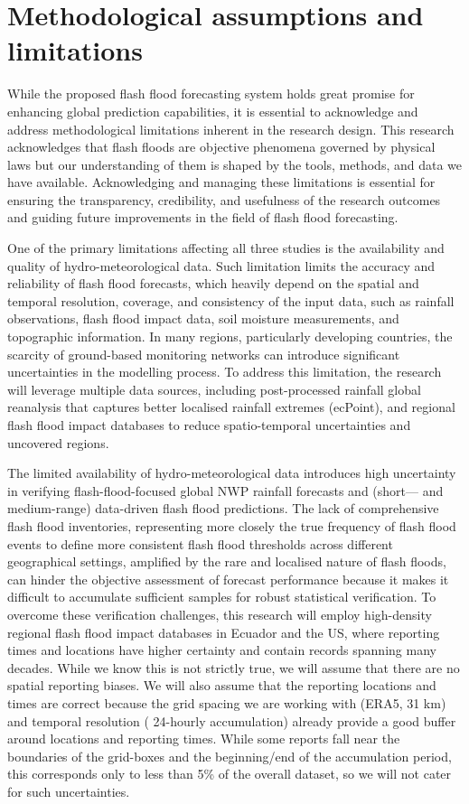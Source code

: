 \section{Methodological assumptions and limitations} 

While the proposed flash flood forecasting system holds great promise for enhancing global prediction capabilities, it is essential to acknowledge and address methodological limitations inherent in the research design. This research acknowledges that flash floods are objective phenomena governed by physical laws but our understanding of them is shaped by the tools, methods, and data we have available. Acknowledging and managing these limitations is essential for ensuring the transparency, credibility, and usefulness of the research outcomes and guiding future improvements in the field of flash flood forecasting.

One of the primary limitations affecting all three studies is the availability and quality of hydro-meteorological data. Such limitation limits the accuracy and reliability of flash flood forecasts, which heavily depend on the spatial and temporal resolution, coverage, and consistency of the input data, such as rainfall observations, flash flood impact data, soil moisture measurements, and topographic information. In many regions, particularly developing countries, the scarcity of ground-based monitoring networks can introduce significant uncertainties in the modelling process. To address this limitation, the research will leverage multiple data sources, including post-processed rainfall global reanalysis that captures better localised rainfall extremes (ecPoint), and regional flash flood impact databases to reduce spatio-temporal uncertainties and uncovered regions.

The limited availability of hydro-meteorological data introduces high uncertainty in verifying flash-flood-focused global NWP rainfall forecasts and (short— and medium-range) data-driven flash flood predictions. The lack of comprehensive flash flood inventories, representing more closely the true frequency of flash flood events to define more consistent flash flood thresholds across different geographical settings, amplified by the rare and localised nature of flash floods, can hinder the objective assessment of forecast performance because it makes it difficult to accumulate sufficient samples for robust statistical verification. To overcome these verification challenges, this research will employ high-density regional flash flood impact databases in Ecuador and the US, where reporting times and locations have higher certainty and contain records spanning many decades. While we know this is not strictly true, we will assume that there are no spatial reporting biases. We will also assume that the reporting locations and times are correct because the grid spacing we are working with (ERA5, 31 km) and temporal resolution ( 24-hourly accumulation) already provide a good buffer around locations and reporting times. While some reports fall near the boundaries of the grid-boxes and the beginning/end of the accumulation period, this corresponds only to less than 5\% of the overall dataset, so we will not cater for such uncertainties. 

